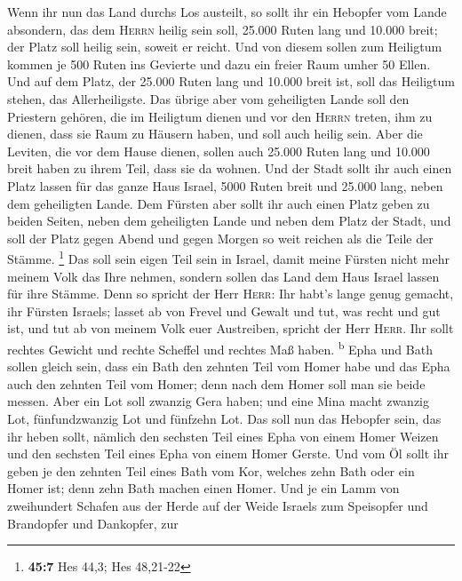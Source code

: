  Wenn ihr nun das Land durchs Los austeilt, so sollt ihr
ein Hebopfer vom Lande absondern, das dem \textsc{Herrn} heilig sein
soll, 25.000 Ruten lang und 10.000 breit; der Platz soll heilig sein,
soweit er reicht.  Und von diesem sollen zum Heiligtum
kommen je 500 Ruten ins Gevierte und dazu ein freier Raum umher 50
Ellen.  Und auf dem Platz, der 25.000 Ruten lang und
10.000 breit ist, soll das Heiligtum stehen, das Allerheiligste.
 Das übrige aber vom geheiligten Lande soll den Priestern
gehören, die im Heiligtum dienen und vor den \textsc{Herrn} treten, ihm
zu dienen, dass sie Raum zu Häusern haben, und soll auch heilig sein.
 Aber die Leviten, die vor dem Hause dienen, sollen auch
25.000 Ruten lang und 10.000 breit haben zu ihrem Teil, dass sie da
wohnen.  Und der Stadt sollt ihr auch einen Platz lassen
für das ganze Haus Israel, 5000 Ruten breit und 25.000 lang, neben dem
geheiligten Lande.  Dem Fürsten aber sollt ihr auch einen
Platz geben zu beiden Seiten, neben dem geheiligten Lande und neben dem
Platz der Stadt, und soll der Platz gegen Abend und gegen Morgen so weit
reichen als die Teile der Stämme. \footnote{\textbf{45:7} Hes 44,3; Hes
  48,21-22}  Das soll sein eigen Teil sein in Israel,
damit meine Fürsten nicht mehr meinem Volk das Ihre nehmen, sondern
sollen das Land dem Haus Israel lassen für ihre Stämme. 
Denn so spricht der Herr \textsc{Herr}: Ihr habt's lange genug gemacht,
ihr Fürsten Israels; lasset ab von Frevel und Gewalt und tut, was recht
und gut ist, und tut ab von meinem Volk euer Austreiben, spricht der
Herr \textsc{Herr}.  Ihr sollt rechtes Gewicht und rechte
Scheffel und rechtes Maß haben. \textsuperscript{b}  Epha
und Bath sollen gleich sein, dass ein Bath den zehnten Teil vom Homer
habe und das Epha auch den zehnten Teil vom Homer; denn nach dem Homer
soll man sie beide messen.  Aber ein Lot soll zwanzig
Gera haben; und eine Mina macht zwanzig Lot, fünfundzwanzig Lot und
fünfzehn Lot.  Das soll nun das Hebopfer sein, das ihr
heben sollt, nämlich den sechsten Teil eines Epha von einem Homer Weizen
und den sechsten Teil eines Epha von einem Homer Gerste. 
Und vom Öl sollt ihr geben je den zehnten Teil eines Bath vom Kor,
welches zehn Bath oder ein Homer ist; denn zehn Bath machen einen Homer.
 Und je ein Lamm von zweihundert Schafen aus der Herde
auf der Weide Israels zum Speisopfer und Brandopfer und Dankopfer, zur
